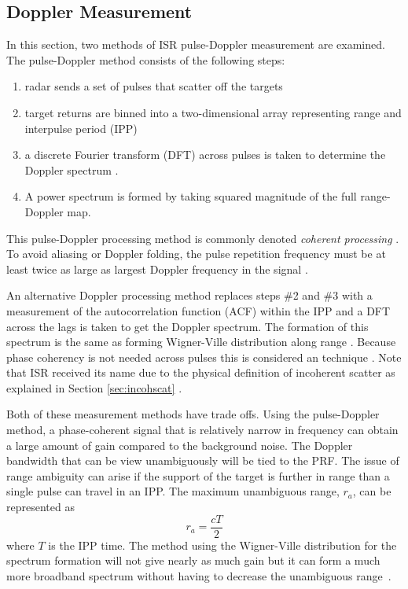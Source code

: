 \subsection{Doppler Measurement}

In this section, two methods of ISR pulse-Doppler measurement are examined. The pulse-Doppler method consists of the following steps:
\begin{enumerate}
\item radar sends a set of pulses that scatter off the targets 
\item target returns are binned into a two-dimensional array representing range and interpulse period (IPP)
\item a discrete Fourier transform (DFT) across pulses is taken to determine the Doppler spectrum \cite{richards2014fundamentals}. 
\item A power spectrum is formed by taking squared magnitude of the full range-Doppler map.  
\end{enumerate}
This pulse-Doppler processing method is commonly denoted \textit{coherent processing} \cite{richards2014fundamentals,richards2010principles,richards2014principles,skolnik2008radar}.
To avoid aliasing or Doppler folding, the pulse repetition frequency must be at least twice as large as largest Doppler frequency in the signal \cite{dtsp:openhiem}. 

An alternative Doppler processing method replaces steps \#2 and \#3 with a measurement of the autocorrelation function (ACF) within the IPP and a DFT across the lags is taken to get the Doppler spectrum.
The formation of this spectrum is the same as forming Wigner-Ville distribution along range \cite{TFAcohen}.
Because phase coherency is not needed across pulses this is considered an  technique \cite{richards2014fundamentals,richards2010principles,richards2014principles,skolnik2008radar}. 
Note that ISR received its name due to the physical definition of incoherent scatter as explained in Section \ref{sec:incohscat} \cite{gordon58,dougherty:farley1960}.

Both of these measurement methods have trade offs. Using the pulse-Doppler method, a phase-coherent signal that is relatively narrow in frequency can obtain a large amount of gain compared to the background noise. The Doppler bandwidth that can be view unambiguously will be tied to the PRF. The issue of range ambiguity can arise if the support of the target is further in range than a single pulse can travel in an IPP. The maximum unambiguous range, $r_a$, can be represented as 
\begin{equation}
\label{eqn:maxuar}
r_a =  \frac{cT}{2}
\end{equation}
where $T$ is the IPP time. 
The method using the Wigner-Ville distribution for the spectrum formation will not give nearly as much gain but it can form a much more broadband spectrum without having to decrease the unambiguous range~\cite{richards2014fundamentals}.

